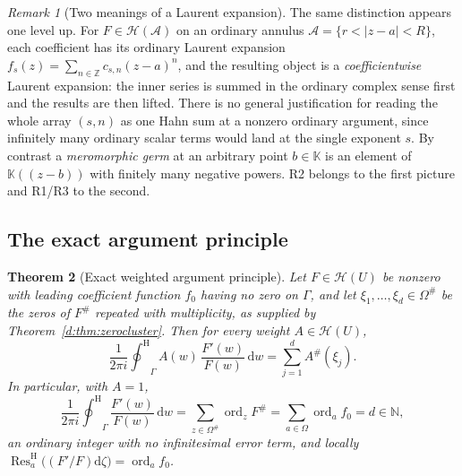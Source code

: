 \documentclass[11pt,a4paper]{article}
\numberwithin{equation}{section}
\newtheorem{theorem}{Theorem}[section]
\theoremstyle{definition}
\theoremstyle{remark}
\newtheorem{remark}[theorem]{Remark}
\theoremstyle{plain}
\newcommand{\K}{\mathbb K}
\newcommand{\ZZ}{\mathbb Z}
\newcommand{\NN}{\mathbb N}
\DeclareMathOperator{\ord}{ord}
\newcommand{\halo}[1]{#1^{\#}}
\newcommand{\ev}[1]{#1^{\#}}
\newcommand{\Hc}{\mathcal H}
\newcommand{\ointH}{{\oint^{\mathrm H}}}
\DeclareMathOperator{\Res}{Res}                 %
\newcommand{\ResH}[1]{\Res^{\mathrm H}_{#1}}    %
\newcommand{\abs}[1]{\lvert #1\rvert}
\newcommand{\dd}{\mathrm d}
\begin{document}
\begin{remark}[Two meanings of a Laurent expansion]
\label{d:rem:twolaurents}
The same distinction appears one level up.  For $F\in\Hc(\mathcal A)$ on
an ordinary annulus $\mathcal A=\{r<\abs{z-a}<R\}$, each coefficient has
its ordinary Laurent expansion
$f_s(z)=\sum_{n\in\ZZ}c_{s,n}(z-a)^{n}$, and the resulting object is a
\emph{coefficientwise} Laurent expansion: the inner series is summed in
the ordinary complex sense first and the results are then lifted.  There
is no general justification for reading the whole array $(s,n)$ as one
Hahn sum at a nonzero ordinary argument, since infinitely many ordinary
scalar terms would land at the single exponent $s$.  By contrast a
\emph{meromorphic germ} at an arbitrary point $b\in\K$ is an element of
$\K((z-b))$ with finitely many negative powers.  R2 belongs to the first
picture and R1/R3 to the second.
\end{remark}

\subsection{The exact argument principle}
\label{d:sub:argument}

\begin{theorem}[Exact weighted argument principle]
\label{d:thm:weightedarg}
Let $F\in\Hc(U)$ be nonzero with leading coefficient function $f_0$
having no zero on $\Gamma$, and let $\xi_1,\dots,\xi_d\in\halo\Omega$ be
the zeros of $\ev F$ repeated with multiplicity, as supplied by
Theorem~\ref{d:thm:zerocluster}.  Then for every weight $A\in\Hc(U)$,
\begin{equation}\label{d:eq:weightedarg}
 \frac1{2\pi i}\ointH_{\Gamma}A(w)\,\frac{F'(w)}{F(w)}\,\dd w
  =\sum_{j=1}^{d}\ev A(\xi_j).
\end{equation}
In particular, with $A=1$,
\begin{equation}\label{d:eq:argument}
 \frac1{2\pi i}\ointH_{\Gamma}\frac{F'(w)}{F(w)}\,\dd w
  =\sum_{z\in\halo\Omega}\ord_z\ev F
  =\sum_{a\in\Omega}\ord_a f_0=d\in\NN,
\end{equation}
an ordinary integer with \emph{no} infinitesimal error term, and
locally $\ResH{a}\bigl((F'/F)\dd\zeta\bigr)=\ord_a f_0$.
\end{theorem}
\end{document}
